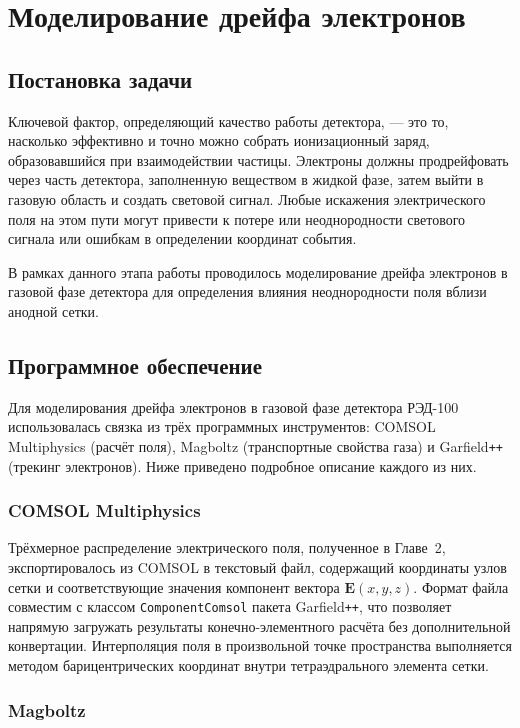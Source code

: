 \documentclass[12pt]{article}
\begin{document}
\section{Моделирование дрейфа электронов}

\subsection{Постановка задачи}

Ключевой фактор, определяющий качество работы детектора, --- это то,
насколько эффективно и точно можно собрать ионизационный заряд,
образовавшийся при взаимодействии частицы. Электроны должны продрейфовать
через часть детектора, заполненную веществом в жидкой фазе, затем выйти
в газовую область и создать световой сигнал. Любые искажения электрического
поля на этом пути могут привести к потере или неоднородности светового
сигнала или ошибкам в определении координат события.

В рамках данного этапа работы проводилось моделирование дрейфа электронов
в газовой фазе детектора для определения влияния неоднородности поля
вблизи анодной сетки.

\subsection{Программное обеспечение}

Для моделирования дрейфа электронов в газовой фазе детектора РЭД-100
использовалась связка из трёх программных инструментов: COMSOL Multiphysics
(расчёт поля), Magboltz (транспортные свойства газа) и Garfield\texttt{++}
(трекинг электронов). Ниже приведено подробное описание каждого из них.

\subsubsection*{COMSOL Multiphysics}

Трёхмерное распределение электрического поля, полученное в Главе~2,
экспортировалось из COMSOL в текстовый файл, содержащий координаты узлов
сетки и соответствующие значения компонент вектора $\mathbf{E}(x,y,z)$.
Формат файла совместим с классом \texttt{ComponentComsol} пакета
Garfield\texttt{++}, что позволяет напрямую загружать результаты
конечно-элементного расчёта без дополнительной конвертации. Интерполяция
поля в произвольной точке пространства выполняется методом барицентрических
координат внутри тетраэдрального элемента сетки.

\subsubsection*{Magboltz}
\end{document}
